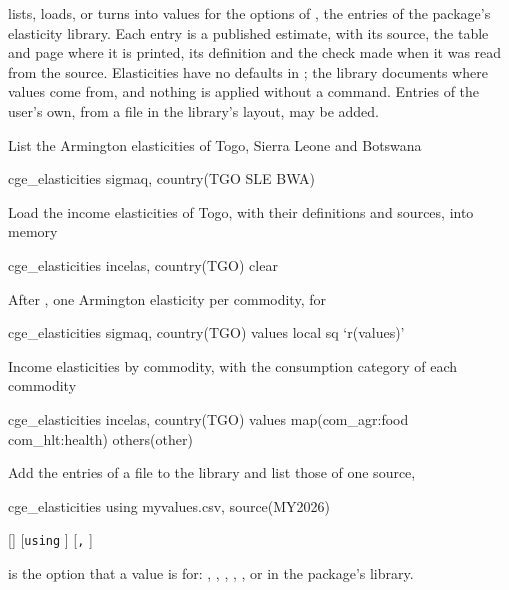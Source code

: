 

 lists, loads, or turns into values for the options of
, the entries of the package's elasticity library. Each
entry is a published estimate, with its source, the table and page where it is
printed, its definition and the check made when it was read from the source.
Elasticities have no defaults in ; the library documents
where values come from, and nothing is applied without a command. Entries of
the user's own, from a file in the library's layout, may be added.


List the Armington elasticities of Togo, Sierra Leone and Botswana
\begin{stcode}
cge_elasticities sigmaq, country(TGO SLE BWA)
\end{stcode}
Load the income elasticities of Togo, with their definitions and sources, into
memory
\begin{stcode}
cge_elasticities incelas, country(TGO) clear
\end{stcode}
After , one Armington elasticity per commodity, for
\begin{stcode}
cge_elasticities sigmaq, country(TGO) values
local sq `r(values)'
\end{stcode}
Income elasticities by commodity, with the consumption category of each
commodity
\begin{stcode}
cge_elasticities incelas, country(TGO) values map(com_agr:food com_hlt:health) others(other)
\end{stcode}
Add the entries of a file to the library and list those of one source,
\begin{stcode}
cge_elasticities using myvalues.csv, source(MY2026)
\end{stcode}


\begin{stsyntax}
 [] [\texttt{using} ]
[\texttt{,} ]
\end{stsyntax}

 is the  option that a value is for:
, , , , ,
 or  in the package's library.

